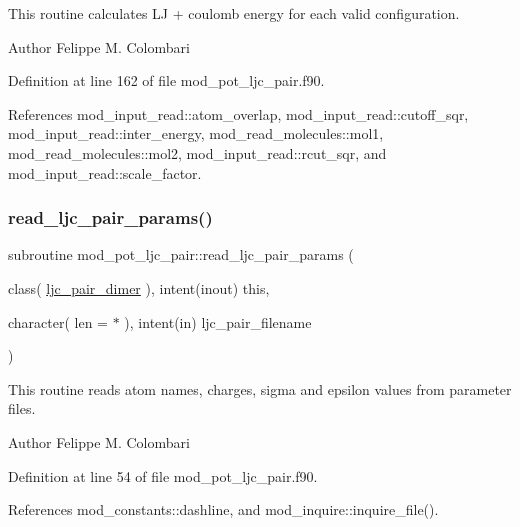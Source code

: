 This routine calculates LJ + coulomb energy for each valid configuration. 

\begin{DoxyAuthor}{Author}
Felippe M. Colombari 
\end{DoxyAuthor}


Definition at line 162 of file mod\+\_\+pot\+\_\+ljc\+\_\+pair.\+f90.



References mod\+\_\+input\+\_\+read\+::atom\+\_\+overlap, mod\+\_\+input\+\_\+read\+::cutoff\+\_\+sqr, mod\+\_\+input\+\_\+read\+::inter\+\_\+energy, mod\+\_\+read\+\_\+molecules\+::mol1, mod\+\_\+read\+\_\+molecules\+::mol2, mod\+\_\+input\+\_\+read\+::rcut\+\_\+sqr, and mod\+\_\+input\+\_\+read\+::scale\+\_\+factor.

\mbox{\label{namespacemod__pot__ljc__pair_a0e073ba5b680fbad3e66c6119a8b0a00}} 
\subsubsection{\texorpdfstring{read\+\_\+ljc\+\_\+pair\+\_\+params()}{read\_ljc\_pair\_params()}}
{\footnotesize\ttfamily subroutine mod\+\_\+pot\+\_\+ljc\+\_\+pair\+::read\+\_\+ljc\+\_\+pair\+\_\+params (\begin{DoxyParamCaption}\item[{class( \hyperlink{structmod__pot__ljc__pair_1_1ljc__pair__dimer}{ljc\+\_\+pair\+\_\+dimer} ), intent(inout)}]{this,  }\item[{character( len = $\ast$ ), intent(in)}]{ljc\+\_\+pair\+\_\+filename }\end{DoxyParamCaption})}



This routine reads atom names, charges, sigma and epsilon values from parameter files. 

\begin{DoxyAuthor}{Author}
Felippe M. Colombari 
\end{DoxyAuthor}


Definition at line 54 of file mod\+\_\+pot\+\_\+ljc\+\_\+pair.\+f90.



References mod\+\_\+constants\+::dashline, and mod\+\_\+inquire\+::inquire\+\_\+file().

